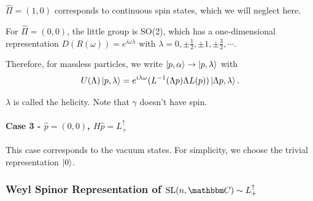 \documentclass{article}
\begin{document}
$\hat\Pi=(1,0)$ corresponds to continuous spin states, which we will neglect here. 

For $\hat\Pi=(0,0)$, the little group is SO(2), which has a one-dimensional representation $D(R(\omega))=e^{i\omega\lambda}$ with $\lambda=0,\pm\frac 12,\pm 1,\pm\frac 32,\cdots$.

Therefore, for massless particles, we write $\ket{p,\alpha}\to\ket{p,\lambda}$ with 
$$U(\Lambda)\ket{p,\lambda}=e^{i\lambda\omega}(L^{-1}(\Lambda p)\Lambda L(p))\ket{\Lambda p,\lambda}.$$

$\lambda$ is called the helicity. Note that $\gamma$ doesn't have spin.

\paragraph{Case 3 - $\hat p=(0,0)$, $H\hat p=L^\uparrow_+$}

This case corresponds to the vacuum states. For simplicity, we choose the trivial representation $\ket 0$.

\subsubsection{Weyl Spinor Representation of $\mathrm{SL}(n,\mathbbm C)\sim L^\uparrow_+$}
\end{document}
